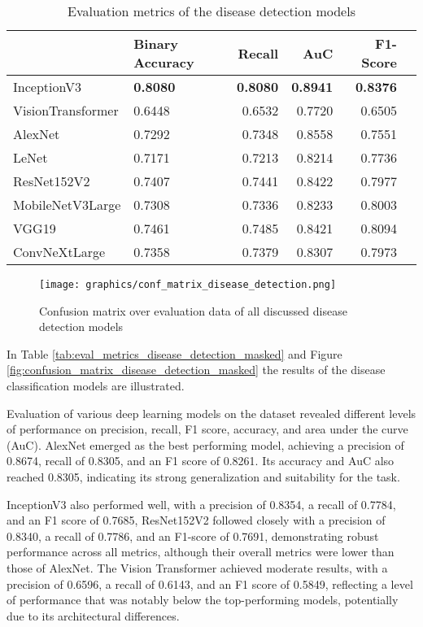 \documentclass[draft,final]{vutinfth} %
\begin{document}
\begin{table}[]
    \centering
    \begin{tabular}{llrrrr}
    \toprule
     & Binary Accuracy & Recall & AuC & F1-Score \\
    \midrule
    InceptionV3 & \textbf{0.8080} & \textbf{0.8080} & \textbf{0.8941} & \textbf{0.8376} \\
    VisionTransformer & 0.6448 & 0.6532 & 0.7720 & 0.6505 \\
    AlexNet & 0.7292 & 0.7348 & 0.8558 & 0.7551 \\
    LeNet & 0.7171 & 0.7213 & 0.8214 & 0.7736 \\
    ResNet152V2 & 0.7407 & 0.7441 & 0.8422 & 0.7977 \\
    MobileNetV3Large & 0.7308 & 0.7336 & 0.8233 & 0.8003 \\
    VGG19 & 0.7461 & 0.7485 & 0.8421 & 0.8094 \\
    ConvNeXtLarge & 0.7358 & 0.7379 & 0.8307 & 0.7973 \\
    \bottomrule
    \end{tabular}
    \caption{Evaluation metrics of the disease detection models}
    \label{tab:eval_metrics_disease_detection}
\end{table}

\begin{figure}[h!]
    \centering
    \texttt{[image: graphics/conf\_matrix\_disease\_detection.png]}
    \caption{Confusion matrix over evaluation data of all discussed disease detection models}
    \label{fig:confusion_matrix_disease_detection}
\end{figure}
\fi

In Table \ref{tab:eval_metrics_disease_detection_masked} and Figure \ref{fig:confusion_matrix_disease_detection_masked} the results of the disease classification models are illustrated. 

Evaluation of various deep learning models on the dataset revealed different levels of performance on precision, recall, F1 score, accuracy, and area under the curve (AuC). AlexNet emerged as the best performing model, achieving a precision of 0.8674, recall of 0.8305, and an F1 score of 0.8261. Its accuracy and AuC also reached 0.8305, indicating its strong generalization and suitability for the task.

InceptionV3 also performed well, with a precision of 0.8354, a recall of 0.7784, and an F1 score of 0.7685, ResNet152V2 followed closely with a precision of 0.8340, a recall of 0.7786, and an F1-score of 0.7691, demonstrating robust performance across all metrics, although their overall metrics were lower than those of AlexNet. The Vision Transformer achieved moderate results, with a precision of 0.6596, a recall of 0.6143, and an F1 score of 0.5849, reflecting a level of performance that was notably below the top-performing models, potentially due to its architectural differences.
\end{document}
